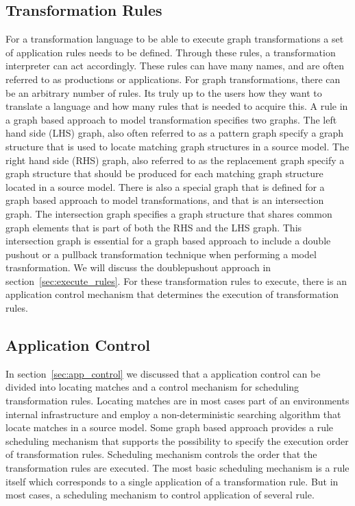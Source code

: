 \subsection{Transformation Rules}
For a transformation language to be able to execute graph
transformations a set of application rules needs to be defined. Through these
rules, a transformation interpreter can act accordingly. These rules can have
many names, and are often referred to as productions or applications. For graph
transformations, there can be an arbitrary number of rules. Its truly up to the
users how they want to translate a language and how many rules that is needed
to acquire this. A rule in a graph based approach to model transformation
specifies two graphs. The left hand side (LHS) graph, also often referred to as
a pattern graph specify a graph structure that is used to locate matching graph
structures in a source model. The right hand side (RHS) graph, also referred to
as the replacement graph specify a graph structure that should be produced for
each matching graph structure located in a source model. There is also a
special graph that is defined for a graph based approach to model
transformations, and that is an intersection graph. The intersection graph
specifies a graph structure that shares common graph elements that is part of
both the RHS and the LHS graph. This intersection graph is essential for a
graph based approach to include a double pushout or a pullback transformation
technique when performing a model trasnformation. We will discuss the
doublepushout approach in section~\ref{sec:execute_rules}. For these
transformation rules to execute, there is an application control mechanism that
determines the execution of transformation rules.

\subsection{Application Control}

In section~\ref{sec:app_control} we discussed that a application control can be
divided into locating matches and a control mechanism for scheduling
transformation rules. Locating matches are in most cases part of an environments
internal infrastructure and employ a non-deterministic searching algorithm that
locate matches in a source model. Some graph based approach provides a rule
scheduling mechanism that supports the possibility to specify the execution
order of transformation rules. Scheduling mechanism controls the order that the
transformation rules are executed. The most basic scheduling mechanism is a rule
itself which corresponds to a single application of a transformation rule. But
in most cases, a scheduling mechanism to control application of several rule.


